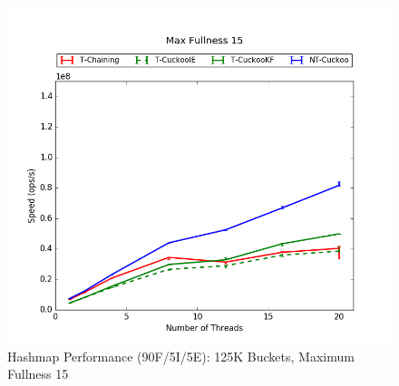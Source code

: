 \begin{figure}[H]
    \centering
	\begin{minipage}{0.5\textwidth}\includegraphics[width=\textwidth]{maps/15HM125K:F90,I5,E5.png} 
    \end{minipage}
	\begin{minipage}{0.4\textwidth}
    
    \end{minipage}
    \caption{Hashmap Performance (90F/5I/5E): 125K Buckets, Maximum Fullness 15}
\end{figure}

